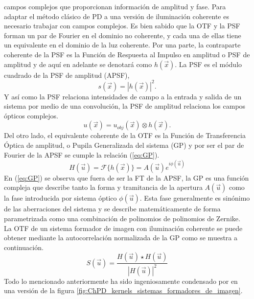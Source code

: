 campos complejos que proporcionan información de amplitud y fase. Para
adaptar el método clásico de PD a una versión de iluminación coherente
es necesario trabajar con campos complejos. Es bien sabido que la OTF
y la PSF forman un par de Fourier en el dominio no coherente, y cada
una de ellas tiene un equivalente en el dominio de la luz
coherente. Por una parte, la contraparte coherente de la PSF es la
Función de Respuesta al Impulso en amplitud o PSF de amplitud y de
aquí en adelante se denotará como $h(\vec{x})$. La PSF es el módulo
cuadrado de la PSF de amplitud (APSF), 
\begin{equation}\label{eq:PSF}
s(\vec{x}) = |h(\vec{x})|^2.
\end{equation}
Y así
como la PSF relaciona intensidades de campo a la entrada y salida de
un sistema por medio de una convolución, la PSF de amplitud relaciona
los campos ópticos complejos.
 \begin{equation}\label{eq:Output_Image_complex}
u(\vec{x}) = u_{obj}(\vec{x}) \otimes h(\vec{x}).
\end{equation}
Del otro lado, el equivalente coherente de la OTF es la Función de
Transferencia Óptica de amplitud, o Pupila Generalizada del sistema
(GP) y por ser el par de Fourier de la APSF se cumple la relación (\ref{eq:GP}). 
\begin{equation}\label{eq:GP}
 H(\vec{u}) = \mathcal{F} \{h(\vec{x})\} =  A(\vec{u}) e^{i\phi(\vec{u})}
\end{equation}
En (\ref{eq:GP}) se observa que fuera de ser la FT de la APSF, la GP es
una función compleja que describe tanto la forma y
tramitancia de la apertura $A(\vec{u})$ como la fase introducida por sistema
óptico $\phi(\vec{u})$. Esta fase generalmente es sinónimo de las
aberraciones del sistema y se describe matemáticamente de forma
parametrizada como una combinación de polinomios de polinomios de Zernike.\\
La OTF de un sistema formador de imagen con iluminación coherente se
puede obtener mediante la autocorrelación normalizada de la GP como se
muestra a continuación.
\begin{equation}\label{eq:OTF}
S(\vec{u}) = \frac{H(\vec{u}) \star H(\vec{u})}{|H(\vec{u})|^2}
\end{equation}
Todo lo mencionado anteriormente ha sido ingeniosamente condensado por
 en una versión de la figura
\ref{fig:ChPD_kernels_sistemas_formadores_de_imagen}. 
